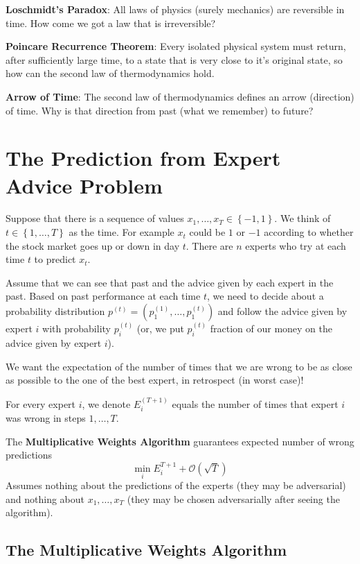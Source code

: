 \documentclass{article}
\begin{document}
\textbf{Loschmidt's Paradox}: All laws of physics (surely mechanics) are reversible in time. How come we got a law that is irreversible?

\textbf{Poincare Recurrence Theorem}: Every isolated physical system must return, after sufficiently large time, to a state that is very close to it's original state, so how can the second law of thermodynamics hold.

\textbf{Arrow of Time}: The second law of thermodynamics defines an arrow (direction) of time. Why is that direction from past (what we remember) to future?

\section{The Prediction from Expert Advice Problem}

Suppose that there is a sequence of values $x_1,\ldots,x_T\in\left\{-1,1\right\}$. We think of $t\in\left\{1,\ldots,T\right\}$ as the time. For example $x_t$ could be $1$ or $-1$ according to whether the stock market goes up or down in day $t$. There are $n$ experts who try at each time $t$ to predict $x_t$.

Assume that we can see that past and the advice given by each expert in the past. Based on past performance at each time $t$, we need to decide about a probability distribution $p^{(t)}=\left(p_1^{(1)},\ldots,p_1^{(t)}\right)$ and follow the advice given by expert $i$ with probability $p_i^{(t)}$ (or, we put $p_i^{(t)}$ fraction of our money on the advice given by expert $i$).

We want the expectation of the number of times that we are wrong to be as close as possible to the one of the best expert, in retrospect (in worst case)!

For every expert $i$, we denote $E_i^{(T+1)}$ equals the number of times that expert $i$ was wrong in steps $1,\ldots,T$.

The \textbf{Multiplicative Weights Algorithm} guarantees expected number of wrong predictions
\[
\min_i E_i^{T+1} + \mathcal{O}\left(\sqrt{T}\right)
\]
Assumes nothing about the predictions of the experts (they may be adversarial) and nothing about $x_1,\ldots,x_T$ (they may be chosen adversarially after seeing the algorithm).

\subsection{The Multiplicative Weights Algorithm}
\end{document}
